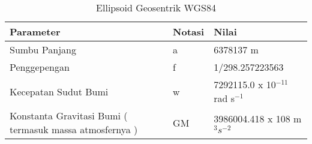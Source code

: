 \begin{table}[h]
\caption{Ellipsoid Geosentrik WGS84}
\centering
\begin{tabular}{p{1.25in}p{1.25in}p{1.25in}}
\hline
Parameter&Notasi&Nilai\\
\hline
Sumbu Panjang & a & 6378137 m\\
Penggepengan & f & 1/298.257223563\\
Kecepatan Sudut Bumi & w & 7292115.0 x 10$^{-11}$ rad s$^{-1}$\\
Konstanta Gravitasi Bumi ( termasuk massa atmosfernya ) & GM & 3986004.418 x 108 m$^3$$ s^{-2}$\\
\hline
\end{tabular}
\label{table:contoh}
\end{table}

